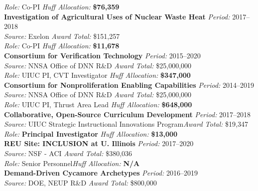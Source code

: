 \documentclass[margin,line]{resume}
\begin{document}
\begin{resume}
    \textsl{Role:} Co-PI \hfill \textsl{Huff Allocation:} \textbf{\$76,359}\vspace{2mm}\\%
    \textbf{Investigation of Agricultural Uses of Nuclear Waste Heat} \hfill \textsl{Period:} 2017--2018\\
    \textsl{Source:} Exelon \hfill \textsl{Award Total:} \$151,257\\
    \textsl{Role:} Co-PI \hfill \textsl{Huff Allocation:} \textbf{\$11,678}\vspace{2mm}\\%
    \textbf{Consortium for Verification Technology} \hfill \textsl{Period:} 2015--2020\\
    \textsl{Source:} NNSA Office of DNN R\&D \hfill \textsl{Award Total:} \$25,000,000\\
    \textsl{Role:} UIUC PI, CVT Investigator  \hfill \textsl{Huff Allocation:} \textbf{\$347,000}\vspace{2mm}\\%
    \textbf{Consortium for Nonproliferation Enabling Capabilities} \hfill \textsl{Period:} 2014--2019\\
    \textsl{Source:} NNSA Office of DNN R\&D \hfill \textsl{Award Total:} \$25,000,000\\
    \textsl{Role:} UIUC PI, Thrust Area Lead  \hfill \textsl{Huff Allocation:} \textbf{\$648,000}\vspace{2mm}\\%
    \textbf{Collaborative, Open-Source Curriculum Development} \hfill \textsl{Period:} 2017--2018\\
    \textsl{Source:} UIUC Strategic Instructional Innovations Program\hfill \textsl{Award Total:} \$19,347\\
    \textsl{Role:} \textbf{Principal Investigator}  \hfill \textsl{Huff Allocation:} \textbf{\$13,000}\vspace{2mm}\\%
    \textbf{REU Site: INCLUSION at U. Illinois} \hfill \textsl{Period:}
    2017--2020\\
    \textsl{Source:} NSF - ACI \hfill \textsl{Award Total:} \$380,036\\
    \textsl{Role:} Senior Personnel\hfill \textsl{Huff Allocation:} \textbf{N/A}\vspace{2mm}\\%
    \textbf{Demand-Driven Cycamore Archetypes} \hfill \textsl{Period:} 2016--2019\\
    \textsl{Source:} DOE, NEUP R\&D \hfill \textsl{Award Total:} \$800,000\\

\end{resume}
\end{document}
